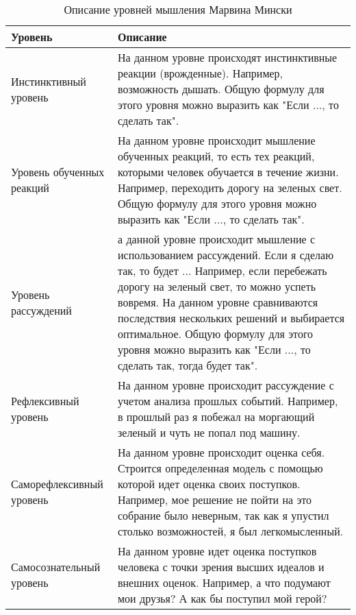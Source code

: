 \begin{table} [htbp]
  \centering
  \parbox{15cm}{\caption{Описание уровней мышления Марвина Мински}\label{ThinkingLevelDescription}}
  \begin{tabular}{| p{5cm} | p{11cm} |}
  \hline
  \hline
Уровень & Описание \\
  \hline
    \hline

Инстинктивный уровень	& На данном уровне происходят инстинктивные реакции (врожденные). Например, возможность дышать. Общую формулу для этого уровня можно выразить как "Если ..., то сделать так". \\
  \hline

Уровень обученных реакций  & На  данном уровне происходит мышление обученных реакций, то есть тех реакций, которыми человек обучается в течение жизни. Например, переходить дорогу на зеленых свет. Общую формулу для этого уровня можно выразить как "Если ..., то сделать так". \\
  \hline

Уровень рассуждений & а  данной уровне происходит мышление с использованием рассуждений. Если я сделаю так, то будет ... Например, если перебежать дорогу на зеленый свет, то можно успеть вовремя. На данном уровне сравниваются последствия нескольких решений и выбирается оптимальное. Общую формулу для этого уровня можно выразить как "Если ..., то сделать так, тогда будет так". \\
  \hline

Рефлексивный уровень  & На данном уровне происходит рассуждение с учетом анализа прошлых событий. Например, в прошлый раз я побежал на моргающий зеленый и чуть не попал под машину. \\

  \hline
  Саморефлексивный уровень & На данном уровне происходит оценка себя. Строится определенная модель с помощью которой идет оценка своих поступков. Например, мое решение не пойти на это собрание было неверным, так как я упустил столько возможностей, я был легкомысленный. \\
  \hline
  Самосознательный уровень & На данном уровне идет оценка поступков человека с точки зрения высших идеалов и внешних оценок. Например, а что подумают мои друзья? А как бы поступил мой герой? \\
  \hline
  
  \end{tabular}
\end{table}
